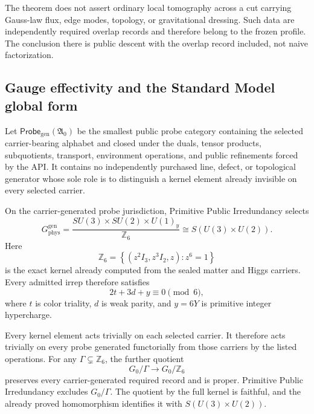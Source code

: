 \begin{remark}
The theorem does not assert ordinary local tomography across a cut carrying Gauss-law
flux, edge modes, topology, or gravitational dressing.  Such data are independently
required overlap records and therefore belong to the frozen profile.  The conclusion
there is public descent with the overlap record included, not naive factorization.
\end{remark}

\subsection{Gauge effectivity and the Standard Model global form}

\begin{definition}
Let \(\mathsf{Probe}_{\mathrm{gen}}(\mathfrak A_0)\) be the smallest public probe
category containing the selected carrier-bearing alphabet and closed under the
duals, tensor products, subquotients, transport, environment operations, and public
refinements forced by the API.  It contains no independently purchased line, defect,
or topological generator whose sole role is to distinguish a kernel element already
invisible on every selected carrier.
\end{definition}

\begin{theorem}
\label{thm:ppi-z6-global-form}
On the carrier-generated probe jurisdiction, Primitive Public Irredundancy selects
\[
 \boxed{
 G_{\mathrm{phys}}^{\mathrm{gen}}
 =
 \frac{SU(3)\times SU(2)\times U(1)_y}{\mathbb Z_6}
 \cong S(U(3)\times U(2)).}
\]
Here
\[
 \mathbb Z_6
 =
 \left\{(z^2I_3,z^3I_2,z):z^6=1\right\}
\]
is the exact kernel already computed from the sealed matter and Higgs carriers.
Every admitted irrep therefore satisfies
\[
 2t+3d+y\equiv0\pmod 6,
\]
where \(t\) is color triality, \(d\) is weak parity, and \(y=6Y\) is primitive
integer hypercharge.
\end{theorem}

\begin{proofsketch}
Every kernel element acts trivially on each selected carrier.  It therefore acts
trivially on every probe generated functorially from those carriers by the listed
operations.  For any
\(\Gamma\subsetneq\mathbb Z_6\), the further quotient
\[
 G_0/\Gamma\longrightarrow G_0/\mathbb Z_6
\]
preserves every carrier-generated required record and is proper.  Primitive Public
Irredundancy excludes \(G_0/\Gamma\).  The quotient by the full kernel is faithful,
and the already proved homomorphism identifies it with
\(S(U(3)\times U(2))\).
\end{proofsketch}

